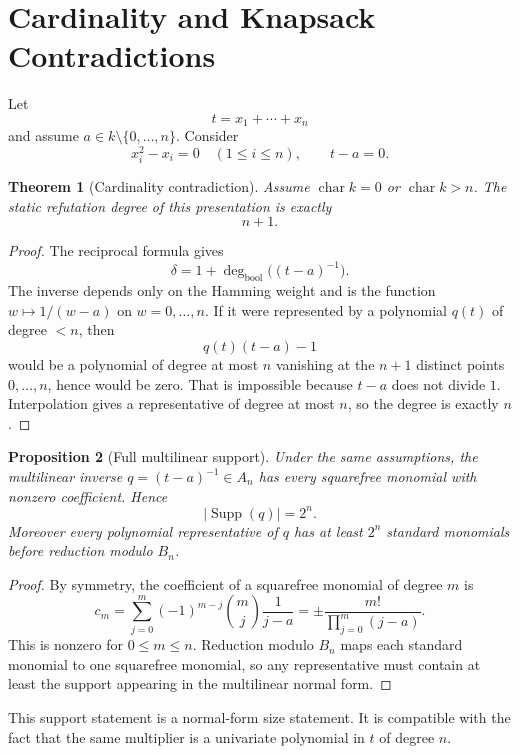 \documentclass[11pt]{article}
\newtheorem{theorem}{Theorem}[section]
\newtheorem{proposition}[theorem]{Proposition}
\DeclareMathOperator{\charac}{char}
\DeclareMathOperator{\Supp}{Supp}
\begin{document}
\section{Cardinality and Knapsack Contradictions}

Let
\[
t=x_1+\cdots+x_n
\]
and assume \(a\in k\setminus\{0,\ldots,n\}\). Consider
\[
x_i^2-x_i=0\quad(1\le i\le n),\qquad t-a=0.
\]

\begin{theorem}[Cardinality contradiction]
Assume \(\charac k=0\) or \(\charac k>n\). The static refutation degree of this presentation is exactly
\[
n+1.
\]
\end{theorem}

\begin{proof}
The reciprocal formula gives
\[
\delta=1+\deg_{\mathrm{bool}}\bigl((t-a)^{-1}\bigr).
\]
The inverse depends only on the Hamming weight and is the function \(w\mapsto 1/(w-a)\) on \(w=0,\ldots,n\). If it were represented by a polynomial \(q(t)\) of degree \(<n\), then
\[
q(t)(t-a)-1
\]
would be a polynomial of degree at most \(n\) vanishing at the \(n+1\) distinct points \(0,\ldots,n\), hence would be zero. That is impossible because \(t-a\) does not divide \(1\). Interpolation gives a representative of degree at most \(n\), so the degree is exactly \(n\).
\end{proof}

\begin{proposition}[Full multilinear support]
Under the same assumptions, the multilinear inverse \(q=(t-a)^{-1}\in A_n\) has every squarefree monomial with nonzero coefficient. Hence
\[
|\Supp(q)|=2^n.
\]
Moreover every polynomial representative of \(q\) has at least \(2^n\) standard monomials before reduction modulo \(B_n\).
\end{proposition}

\begin{proof}
By symmetry, the coefficient of a squarefree monomial of degree \(m\) is
\[
c_m=\sum_{j=0}^m(-1)^{m-j}\binom mj\frac1{j-a}
=\pm\frac{m!}{\prod_{j=0}^m(j-a)}.
\]
This is nonzero for \(0\le m\le n\). Reduction modulo \(B_n\) maps each standard monomial to one squarefree monomial, so any representative must contain at least the support appearing in the multilinear normal form.
\end{proof}

This support statement is a normal-form size statement. It is compatible with the fact that the same multiplier is a univariate polynomial in \(t\) of degree \(n\).
\end{document}
